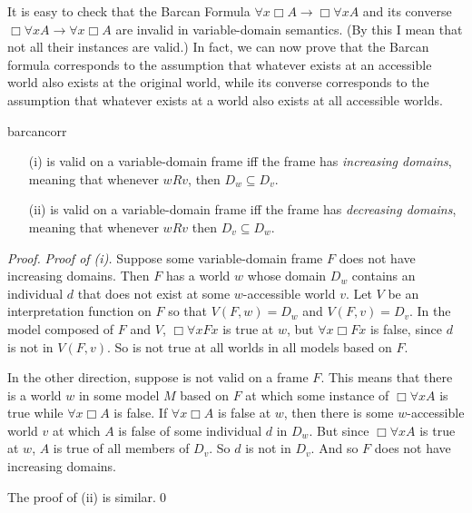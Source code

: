 It is easy to check that the Barcan Formula
$\forall x \Box A \to \Box \forall x A$ and its converse
$\Box \forall x A \to \forall x \Box A$ are invalid in variable-domain
semantics. (By this I mean that not all their instances are valid.) In fact, we
can now prove that the Barcan formula corresponds to the assumption that
whatever exists at an accessible world also exists at the original world, while
its converse corresponds to the assumption that whatever exists at a world also
exists at all accessible worlds.

\begin{observation}{barcancorr}
  \vspace{-1mm}
  \begin{enumerate}[leftmargin=10mm]
    \itemsep0mm
  \item[(i)]  is valid on a variable-domain frame iff the frame has
    \emph{increasing domains}, meaning that whenever $wRv$, then
    $D_w \subseteq D_v$.
    
  \item[(ii)]  is valid on a variable-domain frame iff the frame has
    \emph{decreasing domains}, meaning that whenever $wRv$ then
    $D_v \subseteq D_w$.
  \end{enumerate}
  \vspace{-2mm}
\end{observation}
%
\begin{proof}
  \emph{Proof of (i).} Suppose some variable-domain frame $F$ does not have
  increasing domains. Then $F$ has a world $w$ whose domain $D_w$ contains an
  individual $d$ that does not exist at some $w$-accessible world $v$. Let $V$
  be an interpretation function on $F$ so that $V(F,w) = D_w$ and
  $V(F,v) = D_v$. In the model composed of $F$ and $V$, $\Box \forall x Fx$ is
  true at $w$, but $\forall x \Box Fx$ is false, since $d$ is not in $V(F,v)$.
  So  is not true at all worlds in all models based on $F$.

  In the other direction, suppose  is not valid on a frame $F$. This
  means that there is a world $w$ in some model $M$ based on $F$ at which some
  instance of $\Box \forall x A$ is true while $\forall x \Box A$ is false. If
  $\forall x \Box A$ is false at $w$, then there is some $w$-accessible world
  $v$ at which $A$ is false of some individual $d$ in $D_w$. But since
  $\Box \forall x A$ is true at $w$, $A$ is true of all members of $D_v$. So $d$
  is not in $D_v$. And so $F$ does not have increasing domains.

  The proof of (ii) is similar.\qed
  
\end{proof}

